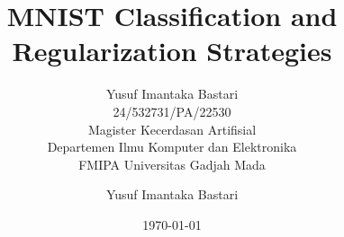 


\usepackage{booktabs}
\usepackage{array}
\usepackage{amsmath}
\usepackage{graphicx}

\newcommand{\repourl}{https://github.com/yusufimantaka/deep-learning-matkul}
\newcommand{\notebookurl}{https://github.com/yusufimantaka/deep-learning-matkul/blob/main/main.ipynb}

\title{MNIST Classification and\\Regularization Strategies}
\subtitle{{\fontsize{10}{13}\selectfont Yusuf Imantaka Bastari\\[2pt] 24/532731/PA/22530\\[2pt] Magister Kecerdasan Artifisial\\[2pt] Departemen Ilmu Komputer dan Elektronika\\[2pt] FMIPA Universitas Gadjah Mada}}
\author{Yusuf Imantaka Bastari}
\date{\today}



\maketitle

